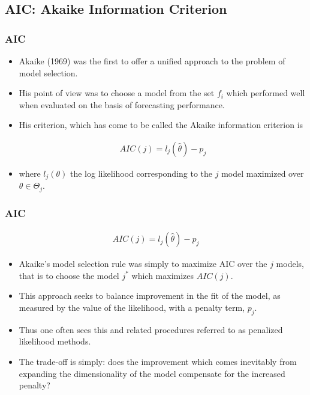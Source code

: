 \documentclass[
  shownotes,
  xcolor={svgnames},
  hyperref={colorlinks,citecolor=DarkBlue,linkcolor=DarkRed,urlcolor=DarkBlue}
  ]{beamer}
\begin{document}
\subsection{AIC: Akaike Information Criterion}
\begin{frame}[fragile]
\frametitle{AIC}

\begin{itemize}

\item Akaike (1969) was the first to offer a unified approach to the problem of model selection. 

\item His point of view was to choose a model from the set ${f_i}$ which performed well when evaluated on the basis of forecasting performance. 

\item His criterion, which has come to be called the Akaike information criterion is

\begin{align}
AIC(j) = l_j(\hat \theta) - p_j
\end{align}

\item where $l_j(\theta) $ the log likelihood corresponding to the $j$ model maximized over $\theta\in\Theta_j$. 

\end{itemize}
\end{frame}

\begin{frame}[fragile]
\frametitle{AIC}

\begin{align}
AIC(j) = l_j(\hat \theta) - p_j
\end{align}
\begin{itemize}

\item Akaike’s model selection rule was simply to maximize AIC over the $j$ models, that is to choose the model $j^*$ which maximizes $AIC(j)$.

\item This approach seeks to balance improvement in the fit of the model, as measured by the value of the likelihood, with a penalty term, $p_j$. 

\item Thus one often sees this and related procedures referred to as penalized likelihood methods. 

\item The trade-off is simply: does the improvement which comes inevitably from expanding the dimensionality of the model compensate for the increased penalty?

\end{itemize}
\end{frame}
\end{document}

